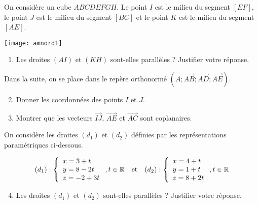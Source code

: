 \documentclass[11pt,fleqn, openany]{book} %
\begin{document}
\begin{exercise}[topic=geo05, subtitle={(Amérique du Nord 2021)}]

On considère un cube $ABCDEFGH$. Le point $I$ est le milieu du segment $[EF]$, le point $J$ est le milieu du segment $[BC]$ et le point $K$ est le milieu du segment $[AE]$.

\begin{center}
\texttt{[image: amnord1]}
\end{center}

\begin{enumerate}
\item Les droites $(AI)$ et $(KH)$ sont-elles parallèles ? Justifier votre réponse.
\end{enumerate}
Dans la suite, on se place dans le repère orthonormé $(A ; \overrightarrow{AB} ; \overrightarrow{AD}; \overrightarrow{AE})$.
\begin{enumerate}
\setcounter{enumi}{1}
\item Donner les coordonnées des points $I$ et $J$.
\item Montrer que les vecteurs $\overrightarrow{IJ}$, $\overrightarrow{AE}$ et $\overrightarrow{AC}$ sont coplanaires.
\end{enumerate}
On considère les droites $(d_1)$ et $(d_2)$ définies par les représentations paramétriques ci-dessous.

\[ (d_1) : \left\{\renewcommand{\arraystretch}{1}\begin{array}{l} x = 3+t \\ y = 8-2t\\ z = -2+3t 
\end{array}\right. , t\in \mathbb{R} \quad \text{et} \quad (d_2) : \left\{\renewcommand{\arraystretch}{1}\begin{array}{l} x = 4+t \\ y = 1+t \\ z = 8+2t
\end{array}\right. , t\in \mathbb{R}\]

\begin{enumerate}
\setcounter{enumi}{3}
\item Les droites $(d_1)$ et $(d_2)$ sont-elles parallèles ? Justifier votre réponse.
\end{enumerate}
\newpage
\end{exercise}
\end{document}
